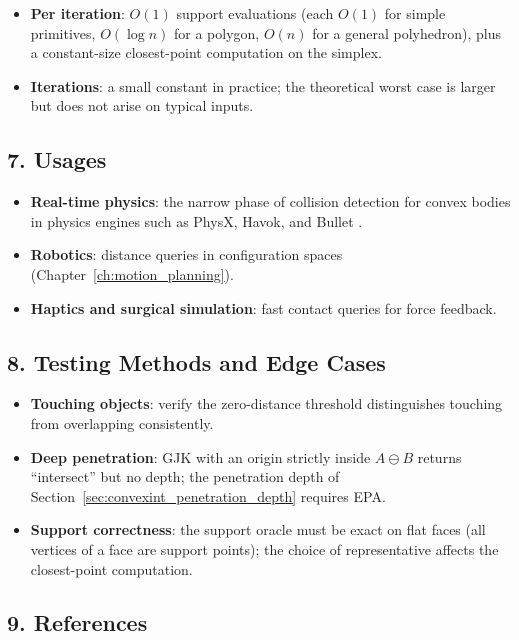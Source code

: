 \begin{itemize}
\item \textbf{Per iteration}: $O(1)$ support evaluations (each $O(1)$ for
  simple primitives, $O(\log n)$ for a polygon, $O(n)$ for a general
  polyhedron), plus a constant-size closest-point computation on the
  simplex.
\item \textbf{Iterations}: a small constant in practice; the theoretical
  worst case is larger but does not arise on typical inputs.
\end{itemize}

\subsection{7. Usages}

\begin{itemize}
\item \textbf{Real-time physics}: the narrow phase of collision detection
  for convex bodies in physics engines such as PhysX, Havok, and Bullet
  \cite{ericson2004,vandenbergen2004}.
\item \textbf{Robotics}: distance queries in configuration spaces
  (Chapter~\ref{ch:motion_planning}).
\item \textbf{Haptics and surgical simulation}: fast contact queries for
  force feedback.
\end{itemize}

\subsection{8. Testing Methods and Edge Cases}

\begin{itemize}
\item \textbf{Touching objects}: verify the zero-distance threshold
  distinguishes touching from overlapping consistently.
\item \textbf{Deep penetration}: GJK with an origin strictly inside
  $A \ominus B$ returns ``intersect'' but no depth; the penetration depth
  of Section~\ref{sec:convexint_penetration_depth} requires EPA.
\item \textbf{Support correctness}: the support oracle must be exact on
  flat faces (all vertices of a face are support points); the choice of
  representative affects the closest-point computation.
\end{itemize}

\subsection{9. References}

